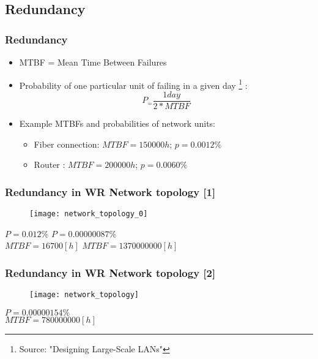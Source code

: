 \documentclass[]{beamer}
\begin{document}
\subsection{Redundancy}

\begin{frame}
  \frametitle{Redundancy}
	\begin{itemize}
	\item MTBF = Mean Time Between Failures
	\item Probability of one particular unit of failing in a given day \footnote{Source: "Designing Large-Scale LANs"} :
	\begin{equation}
		P_= \frac{1 day}{2*MTBF}  
	\end{equation}
	
	\item Example MTBFs and probabilities of network units:
	  \begin{itemize}
	  \item Fiber connection: $MTBF=150 000h$; $p=0.0012\%$
	  \item Router : $MTBF=200 000h$; $p=0.0060\%$
	  \end{itemize}

	\end{itemize}
\end{frame}

\begin{frame}
  \frametitle{Redundancy in WR Network topology [1]}


\begin{figure}[tbp] %
  \centering
  \texttt{[image: network\_topology\_0]}

\end{figure}

$P=0.012\%$  \hspace{4cm}   $P=0.00000087\%$  \\   
$MTBF=16700[h]$ \hspace{2cm} $MTBF=1370000000[h]$ 

\end{frame}

\begin{frame}
  \frametitle{Redundancy in WR Network topology [2]}



\begin{figure}[tbp] %
  \centering

  \texttt{[image: network\_topology]}

\end{figure}
\hspace{4cm}$P=0.00000154\%$    \\  
\hspace{4cm}$MTBF=780000000[h]$ 

  \end{frame}
\end{document}
